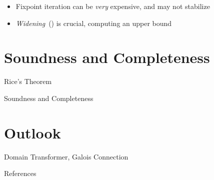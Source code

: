 \documentclass[
   aspectratio=169, %
   10pt, %
   uniqueslidenumber,
   professionalfonts
]{beamer}
\begin{document}
\begin{frame}[fragile]{\insertsubsection}
\begin{onlyenv}
\end{onlyenv}
\begin{itemize}
   \itemsep6.5pt
   \item<13-> Fixpoint iteration can be \textit{very} expensive, and may not stabilize %
   \item<14-> \textit{Widening}~(\absexpr{\widen}) is crucial, computing an upper bound
\end{itemize}
\end{frame}

\section{Soundness and Completeness}
\begin{frame}{Rice's Theorem}
   
\end{frame}

\begin{frame}{Soundness and Completeness}
   
\end{frame}


\section{Outlook}
\begin{frame}{\insertsection}
   Domain Transformer, Galois Connection
\end{frame}






\renewcommand*{\bibfont}{\tiny}

\AtBeginSection{}
\begin{frame}[allowframebreaks]{References}
   \printbibliography[title={}] %
\end{frame}
\end{document}
